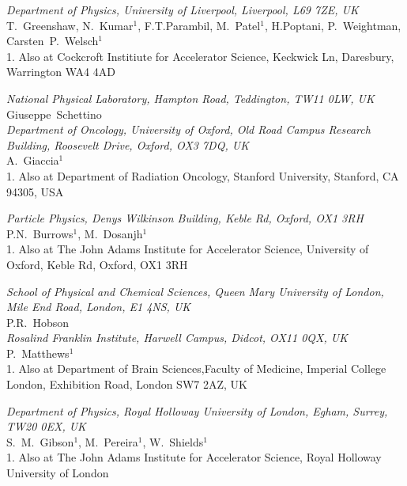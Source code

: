 \noindent \textit{Department of Physics, University of Liverpool, Liverpool, L69 7ZE, UK} \\
T.~Greenshaw, N.~Kumar$^{1}$, F.T.Parambil, M.~Patel$^{1}$, H.Poptani, P.~Weightman, Carsten~P.~Welsch$^{1}$ \\
{\footnotesize
  1. Also at Cockcroft Institiute for Accelerator Science, Keckwick Ln, Daresbury, Warrington WA4 4AD \\
}
 
\noindent \textit{National Physical Laboratory, Hampton Road, Teddington, TW11 0LW, UK} \\
Giuseppe~Schettino \\
 
\noindent \textit{Department of Oncology, University of Oxford, Old Road Campus Research Building, Roosevelt Drive, Oxford, OX3 7DQ, UK} \\
A.~Giaccia$^{1}$ \\
{\footnotesize
  1. Also at Department of Radiation Oncology, Stanford University, Stanford, CA 94305, USA \\
}
 
\noindent \textit{Particle Physics, Denys Wilkinson Building, Keble Rd, Oxford, OX1 3RH} \\
P.N.~Burrows$^{1}$, M.~Dosanjh$^{1}$ \\
{\footnotesize
  1. Also at The John Adams Institute for Accelerator Science, University of Oxford, Keble Rd, Oxford, OX1 3RH \\
}
 
\noindent \textit{School of Physical and Chemical Sciences, Queen Mary University of London, Mile End Road, London, E1 4NS, UK} \\
P.R.~Hobson \\
 
\noindent \textit{Rosalind Franklin Institute, Harwell Campus, Didcot, OX11 0QX, UK} \\
P.~Matthews$^{1}$ \\
{\footnotesize
  1. Also at Department of Brain Sciences,Faculty of Medicine, Imperial College London, Exhibition Road, London SW7 2AZ, UK \\
}
 
\noindent \textit{Department of Physics, Royal Holloway University of London, Egham, Surrey, TW20 0EX, UK} \\
S.~M.~Gibson$^{1}$, M.~Pereira$^{1}$, W.~Shields$^{1}$ \\
{\footnotesize
  1. Also at The John Adams Institute for Accelerator Science, Royal Holloway University of London \\
}
 

